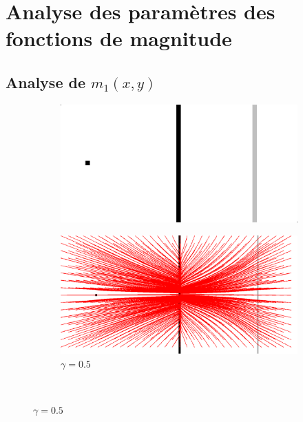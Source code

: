\section{Analyse des paramètres des fonctions de magnitude}
\subsection{Analyse de $m_1(x,y)$}
\begin{figure}[!h]
   \begin{subfigure}[c]{.5\linewidth}
     \centering
     \includegraphics[scale=0.35]{Chapters/Images/synthetic_map.png}
     \caption{}
   \end{subfigure} 
   \begin{subfigure}[c]{.5\linewidth}
     \centering
     \includegraphics[scale=0.35]{Chapters/Images/m1_gamma_5.png}
     \caption{$\gamma=0.5$}
   \end{subfigure} \\
   

\end{figure}
